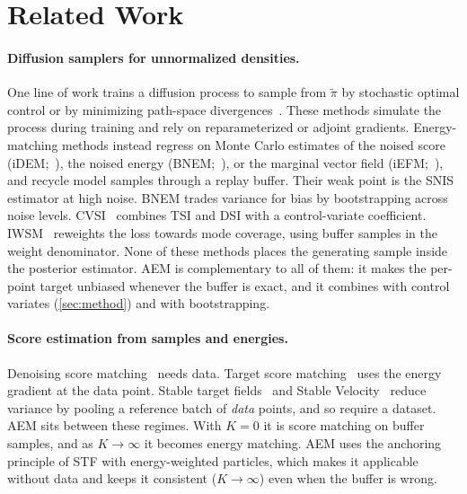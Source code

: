 \section{Related Work}
\label{sec:related}

\paragraph{Diffusion samplers for unnormalized densities.}
One line of work trains a diffusion process to sample from $\tilde\pi$ by stochastic optimal control or by minimizing path-space divergences~\citep{zhang2022path,vargas2023denoising,berner2024optimal,vargas2024transport,richter2024improved,sendera2024improved,bridgelosses2025,havens2025adjoint,proximal2025}. These methods simulate the process during training and rely on reparameterized or adjoint gradients.
Energy-matching methods instead regress on Monte Carlo estimates of the noised score (iDEM;~\citealp{akhound2024iterated}), the noised energy (BNEM;~\citealp{bnem2024}), or the marginal vector field (iEFM;~\citealp{iefm2024}), and recycle model samples through a replay buffer.
Their weak point is the SNIS estimator at high noise. BNEM trades variance for bias by bootstrapping across noise levels. CVSI~\citep{cvsi2025} combines TSI and DSI with a control-variate coefficient. IWSM~\citep{iwsm2025} reweights the loss towards mode coverage, using buffer samples in the weight denominator.
None of these methods places the generating sample inside the posterior estimator. AEM is complementary to all of them: it makes the per-point target unbiased whenever the buffer is exact, and it combines with control variates (\cref{sec:method}) and with bootstrapping.

\paragraph{Score estimation from samples and energies.}
Denoising score matching~\citep{hyvarinen2005estimation,vincent2011connection,song2021score} needs data. Target score matching~\citep{debortoli2024target} uses the energy gradient at the data point. Stable target fields~\citep{xu2023stable} and Stable Velocity~\citep{stablevelocity2026} reduce variance by pooling a reference batch of \emph{data} points, and so require a dataset.
AEM sits between these regimes. With $K=0$ it is score matching on buffer samples, and as $K\to\infty$ it becomes energy matching. AEM uses the anchoring principle of STF with energy-weighted particles, which makes it applicable without data and keeps it consistent ($K\to\infty$) even when the buffer is wrong.

